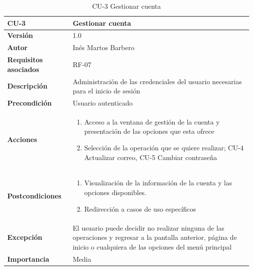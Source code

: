 \begin{table}[p]
	\centering
	\begin{tabularx}{\linewidth}{ p{} p{} }
		\toprule
		\textbf{CU-3}    & \textbf{Gestionar cuenta}\\
		\toprule
		\textbf{Versión}              & 1.0    \\
		\textbf{Autor}                & Inés Martos Barbero \\
		\textbf{Requisitos asociados} & RF-07 \\
		\textbf{Descripción}          & Administración de las credenciales del usuario necesarias para el inicio de sesión \\
		\textbf{Precondición}         & Usuario autenticado \\
		\textbf{Acciones}             &
		\begin{enumerate}
			\def\labelenumi{\arabic{enumi}.}
			\tightlist
			\item Acceso a la ventana de gestión de la cuenta y presentación de las opciones que esta ofrece
			\item Selección de la operación que se quiere realizar; CU-4 Actualizar correo, CU-5 Cambiar contraseña
		\end{enumerate}\\ 
		\textbf{Postcondiciones}        &
		\begin{enumerate}
			\def\labelenumi{\arabic{enumi}.}
			\tightlist
			\item Visualización de la información de la cuenta y las opciones disponibles.
			\item Redirección a casos de uso específicos
		\end{enumerate}\\
		\textbf{Excepción}          & El usuario puede decidir no realizar ninguna de las operaciones y regresar a la pantalla anterior, página de inicio o cualquiera de las opciones del menú principal \\
		\textbf{Importancia}          & Media \\
		\bottomrule
	\end{tabularx}
	\caption{CU-3 Gestionar cuenta}
     \label{CU-3}
\end{table}


